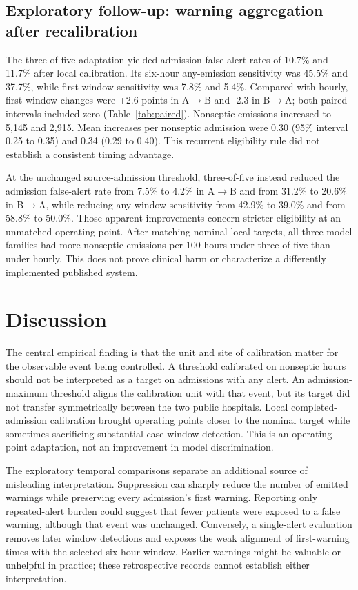 \documentclass[11pt,a4paper]{article}
\begin{document}
\subsection{Exploratory follow-up: warning aggregation after recalibration}
The three-of-five adaptation yielded admission false-alert rates of 10.7\% and 11.7\% after local calibration. Its six-hour any-emission sensitivity was 45.5\% and 37.7\%, while first-window sensitivity was 7.8\% and 5.4\%. Compared with hourly, first-window changes were +2.6 points in A$\to$B and -2.3 in B$\to$A; both paired intervals included zero (Table~\ref{tab:paired}). Nonseptic emissions increased to 5,145 and 2,915. Mean increases per nonseptic admission were 0.30 (95\% interval 0.25 to 0.35) and 0.34 (0.29 to 0.40). This recurrent eligibility rule did not establish a consistent timing advantage.

At the unchanged source-admission threshold, three-of-five instead reduced the admission false-alert rate from 7.5\% to 4.2\% in A$\to$B and from 31.2\% to 20.6\% in B$\to$A, while reducing any-window sensitivity from 42.9\% to 39.0\% and from 58.8\% to 50.0\%. Those apparent improvements concern stricter eligibility at an unmatched operating point. After matching nominal local targets, all three model families had more nonseptic emissions per 100 hours under three-of-five than under hourly. This does not prove clinical harm or characterize a differently implemented published system.


\section{Discussion}
The central empirical finding is that the unit and site of calibration matter for the observable event being controlled. A threshold calibrated on nonseptic hours should not be interpreted as a target on admissions with any alert. An admission-maximum threshold aligns the calibration unit with that event, but its target did not transfer symmetrically between the two public hospitals. Local completed-admission calibration brought operating points closer to the nominal target while sometimes sacrificing substantial case-window detection. This is an operating-point adaptation, not an improvement in model discrimination.

The exploratory temporal comparisons separate an additional source of misleading interpretation. Suppression can sharply reduce the number of emitted warnings while preserving every admission's first warning. Reporting only repeated-alert burden could suggest that fewer patients were exposed to a false warning, although that event was unchanged. Conversely, a single-alert evaluation removes later window detections and exposes the weak alignment of first-warning times with the selected six-hour window. Earlier warnings might be valuable or unhelpful in practice; these retrospective records cannot establish either interpretation.
\end{document}
